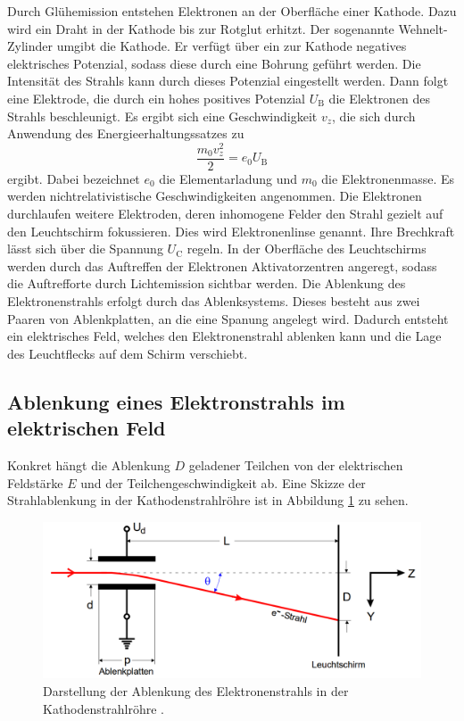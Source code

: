 Durch Glühemission entstehen Elektronen an der Oberfläche einer Kathode. Dazu
wird ein Draht in der Kathode bis zur Rotglut erhitzt. Der sogenannte Wehnelt-Zylinder
umgibt die Kathode. Er verfügt über ein zur Kathode negatives elektrisches Potenzial, sodass diese durch eine Bohrung geführt werden. Die Intensität
des Strahls kann durch dieses Potenzial eingestellt werden.
Dann folgt eine Elektrode, die durch ein hohes positives Potenzial $U_\text{B}$
die Elektronen des Strahls beschleunigt. Es ergibt sich eine Geschwindigkeit $v_z$,
die sich durch Anwendung des Energieerhaltungssatzes zu
\begin{equation}
  \frac{m_0 v_z^2}{2} = e_0 U_\text{B}
  \label{eqn:energie}
\end{equation}
ergibt. Dabei bezeichnet $e_0$ die Elementarladung und $m_0$ die Elektronenmasse.
Es werden nichtrelativistische Geschwindigkeiten angenommen.
Die Elektronen durchlaufen weitere Elektroden, deren inhomogene Felder den Strahl
gezielt auf den Leuchtschirm fokussieren. Dies wird Elektronenlinse genannt. Ihre
Brechkraft lässt sich über die Spannung $U_\text{C}$ regeln. In der Oberfläche des Leuchtschirms
werden durch das Auftreffen der Elektronen Aktivatorzentren angeregt, sodass die
Auftrefforte durch Lichtemission sichtbar werden.
Die Ablenkung des Elektronenstrahls erfolgt durch das Ablenksystems. Dieses besteht aus
zwei Paaren von Ablenkplatten, an die eine Spanung angelegt wird. Dadurch entsteht ein elektrisches
Feld, welches den Elektronenstrahl ablenken kann und die Lage des Leuchtflecks auf
dem Schirm verschiebt.

\subsection{Ablenkung eines Elektronstrahls im elektrischen Feld}
\label{subsec:Ablenkungtheorie}
Konkret hängt die Ablenkung $D$ geladener Teilchen von der elektrischen Feldstärke $E$
und der Teilchengeschwindigkeit ab.
Eine Skizze der Strahlablenkung in der Kathodenstrahlröhre ist in Abbildung \ref{fig:ablenkungtheorie}
zu sehen.

\begin{figure}[H]
  \centering
  \includegraphics[width=350pt]{data/strahlablenkung.png}
  \caption{Darstellung der Ablenkung des Elektronenstrahls in der Kathodenstrahlröhre \cite{Versuchsanleitung501}.}
  \label{fig:ablenkungtheorie}
\end{figure}


